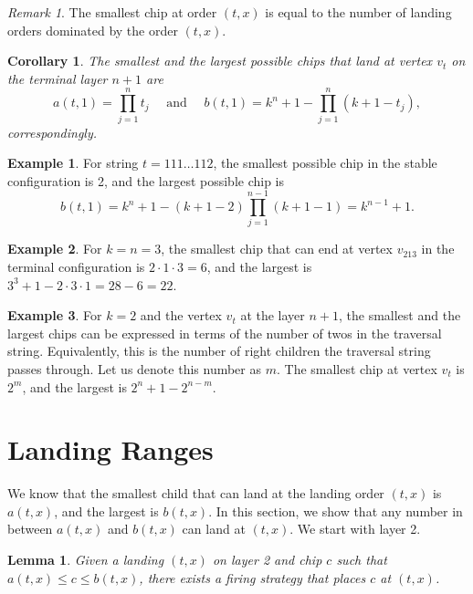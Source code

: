 \documentclass[11pt]{article}
\newtheorem{corollary}{Corollary}[theorem] %
\newtheorem{lemma}[theorem]{Lemma} %
\theoremstyle{definition}
\newtheorem{example}{Example}
\theoremstyle{remark}
\newtheorem*{remark}{Remark} %
\begin{document}
\begin{remark}
    The smallest chip at order $(t,x)$ is equal to the number of landing orders dominated by the order $(t,x)$.
\end{remark}

\begin{corollary}
    The smallest and the largest possible chips that land at vertex $v_t$ on the terminal layer $n+1$ are
    \[a(t, 1) = \prod_{j=1}^n t_j \quad \textrm{ and } \quad b(t, 1) = k^n+1-\prod_{j=1}^n(k+1-t_j),\]
    correspondingly.
\end{corollary}

\begin{example}
\label{ex:endsIn112}
    For string $t = 111\ldots 112$, the smallest possible chip in the stable configuration is 2, and the largest possible chip is 
    \[b(t, 1)= k^n +1- (k+1-2)\prod_{j=1}^{n-1}(k+1-1) = k^{n-1}+1.\]
\end{example}

\begin{example}
    For $k=n=3$, the smallest chip that can end at vertex $v_{213}$ in the terminal configuration is $2\cdot 1 \cdot 3 = 6$, and the largest is $3^3 + 1 - 2 \cdot 3 \cdot 1 = 28 - 6 = 22$.
\end{example}

\begin{example}
    For $k=2$ and the vertex $v_t$ at the layer $n+1$, the smallest and the largest chips can be expressed in terms of the number of twos in the traversal string. Equivalently, this is the number of right children the traversal string passes through. Let us denote this number as $m$. The smallest chip at vertex $v_t$ is $2^m$, and the largest is $2^n + 1 - 2^{n-m}$.
\end{example}





\section{Landing Ranges}
\label{sec:ranges}

We know that the smallest child that can land at the landing order $(t,x)$ is $a(t,x)$, and the largest is $b(t,x)$. In this section, we show that any number in between $a(t,x)$ and $b(t,x)$ can land at $(t,x)$. We start with layer 2.

\begin{lemma}\label{lem:Ranges}
   Given a landing $(t,x)$ on layer 2 and chip $c$ such that $a(t,x) \leq c \leq b(t,x)$, there exists a firing strategy that places $c$ at $(t,x)$.
\end{lemma}
\end{document}
